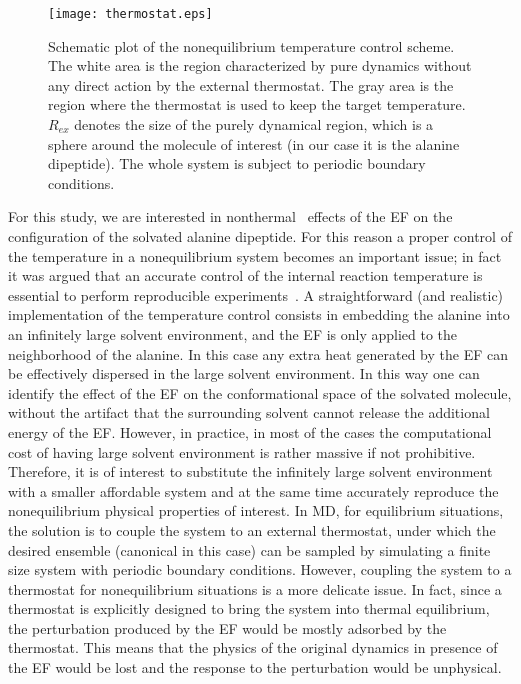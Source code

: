 \documentclass[a4paper,preprint,unsortedaddress,onecolumn]{revtex4-1}
\begin{document}
\begin{figure}
  \centering
  \texttt{[image: thermostat.eps]}
  \caption{Schematic plot of the nonequilibrium temperature control scheme.
    The white area is the region characterized by pure dynamics without any direct action by the external thermostat.
    The gray area is the region where the thermostat is used to keep the target temperature.
    $R_{ex}$ denotes the size of the purely dynamical region, which
    is a sphere around the molecule of interest (in our case it is the alanine
    dipeptide).
    The whole system is subject to periodic boundary conditions. }
  \label{fig:tmp2}
\end{figure}
For this study, we are interested in 
nonthermal~\cite{delaHoz2005microwaves} effects of the EF
on the configuration of the solvated alanine dipeptide.
For this reason a proper control of the temperature in a nonequilibrium system
becomes an important issue; in fact it was argued that  an
accurate control of the internal reaction temperature is essential to
perform reproducible experiments~\cite{damm2012can}.
A straightforward (and realistic) implementation of the temperature control consists in 
embedding the alanine into an infinitely large solvent environment, and 
the EF is only applied to the neighborhood of the alanine. In this case
any extra heat generated by the EF can be effectively
dispersed in the large solvent environment.
In this way one can identify the effect of the EF on the conformational space of the solvated molecule,
without the artifact that the surrounding solvent cannot release the additional energy of the EF.
However, in practice, in most of the cases the computational cost of having large solvent environment is rather massive if not prohibitive.
Therefore, it is of interest to substitute the infinitely large
solvent environment with a smaller affordable system and at the same time accurately reproduce the nonequilibrium
physical properties of interest.
In MD, for equilibrium situations, the solution is to couple
the system to an external thermostat, under which the desired ensemble
(canonical in this case) can be
sampled by simulating a finite size system with periodic boundary
conditions.
However, coupling the system to a thermostat for nonequilibrium situations is a more delicate issue.
In fact, since a thermostat is explicitly designed to bring the system into
thermal equilibrium,
the perturbation produced by the EF would be mostly adsorbed by the thermostat. This means that the physics of the original dynamics in presence of the EF
would be lost and the response to the perturbation would be unphysical.
\end{document}
